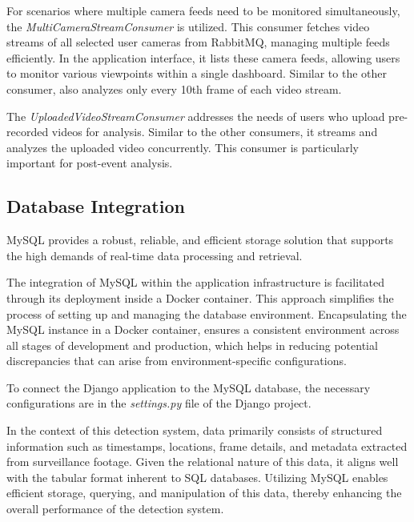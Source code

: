 For scenarios where multiple camera feeds need to be monitored simultaneously, the \textit{MultiCameraStreamConsumer} 
is utilized. This consumer fetches video streams of all selected user cameras from RabbitMQ, managing multiple 
feeds efficiently. In the application interface, it lists these camera feeds, allowing users to monitor various 
viewpoints within a single dashboard.
Similar to the other consumer, also analyzes only every 10th frame of each video stream.

The \textit{UploadedVideoStreamConsumer} addresses the needs of users who upload pre-recorded videos for analysis. 
Similar to the other consumers, it streams and analyzes the uploaded video concurrently. This consumer is particularly 
important for post-event analysis.

\subsection{Database Integration}
MySQL provides a robust, reliable, and efficient storage solution that supports the high demands of 
real-time data processing and retrieval.

The integration of MySQL within the application infrastructure is facilitated through its deployment inside a 
Docker container. This approach simplifies the process of setting up and managing the database 
environment. Encapsulating the MySQL instance in a Docker container, ensures a consistent environment 
across all stages of development and production, which helps in reducing potential discrepancies that 
can arise from environment-specific configurations.

To connect the Django application to the MySQL database, the necessary configurations are in the \textit{settings.py} 
file of the Django project.


In the context of this detection system, data primarily consists of structured information such as timestamps, 
locations, frame details, and metadata extracted from surveillance footage. Given the relational nature of this data, 
it aligns well with the tabular format inherent to SQL databases. Utilizing MySQL enables efficient storage, querying, 
and manipulation of this data, thereby enhancing the overall performance of the detection system.

